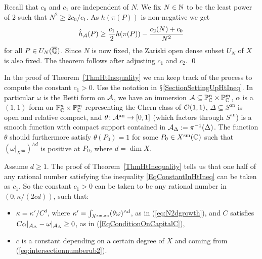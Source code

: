 Recall that $c_0$ and $c_1$ are independent of $N$. We  fix $N\in{\mathbb{N}}$ to be the least
power of $2$ such that $N^2\ge 2c_0/c_1$. As $h(\pi(P))$ is
non-negative we get  %
\[
\hat{h}_{\mathcal{A}}(P) \ge \frac{c_1}{2} h(\pi(P)) - \frac{c_2(N)+ c_0}{N^2}
\]
for all
$P \in U_N({\overline{\mathbb{Q}}})$. Since $N$ is now fixed, the Zariski open dense
subset $U_N$ of $X$ is also fixed.
The theorem follows after adjusting $c_1$ and $c_2$. 
\qed
\begin{remark}
In the proof of Theorem~\ref{ThmHtInequality} we can keep track of the
process to compute the constant $c_1 > 0$. Use the notation in
$\mathsection$\ref{SectionSettingUpHtIneq}. In particular $\omega$ is
the Betti form on $\mathcal{A}$, we have an immersion $\mathcal{A} \subseteq {\mathbb{P}}_{\mathbb{C}}^n
\times {\mathbb{P}}_{\mathbb{C}}^m$, $\alpha$ is a $(1,1)$-form on ${\mathbb{P}}_{\mathbb{C}}^n \times
{\mathbb{P}}_{\mathbb{C}}^m$ representing the Chern class of ${\mathcal O}(1,1)$, $\Delta \subseteq S^{\mathrm{an}}$ is open and relative compact, and $\theta \colon \mathcal{A}^{\mathrm{an}} \rightarrow [0,1]$ (which factors through $S^{\mathrm{an}}$) is a smooth function with compact support contained in $\mathcal{A}_{\Delta} := \pi^{-1}(\Delta)$. The function $\theta$ should furthermore satisfy $\theta(P_0) = 1$ for some $P_0 \in X^{\mathrm{sm}}({\mathbb{C}})$ such that $(\omega|_{X^{\mathrm{sm}}})^{\wedge d}$ is positive at $P_0$, where $d = \dim X$.

Assume $d \ge 1$. The proof of Theorem~\ref{ThmHtInequality} tells us
that one half of any rational number satisfying the inequality
\eqref{EqConstantInHtIneq} can be taken as $c_1$. So the constant $c_1 > 0$ can be taken to be any rational
number
in  $(0,\kappa/(2c d))$, such that: %
\begin{itemize}
\item $\kappa = \kappa'/C^d$, where $\kappa' = \int_{{X}^{\mathrm{sm,an}}}(
  \theta\omega )^{\wedge d}$, as in (\ref{eq:N2dgrowth}), and $C$ satisfies $C
  \alpha|_{\mathcal{A}_{\Delta}} - \omega|_{\mathcal{A}_{\Delta}} \ge 0$, as in (\ref{EqConditionOnCapitalC}),
\item $c$ is a  constant depending on a certain degree of  $X$ and coming from
  (\ref{eq:intersectionnumberub2}). %
\end{itemize}
\end{remark}

